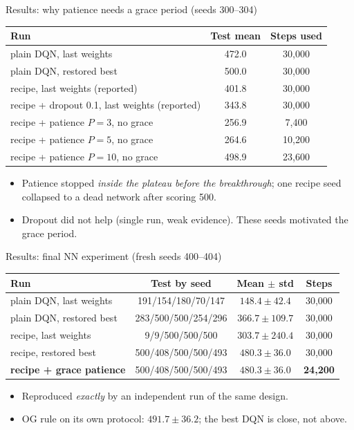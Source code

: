 \documentclass[aspectratio=169]{beamer}
\begin{document}
\begin{frame}{Results: why patience needs a grace period (seeds 300--304)}
\small
\begin{table}
\centering
\begin{tabular}{lcc}
\toprule
\textbf{Run} & \textbf{Test mean} & \textbf{Steps used}\\
\midrule
plain DQN, last weights & 472.0 & 30,000\\
plain DQN, restored best & 500.0 & 30,000\\
recipe, last weights (reported) & 401.8 & 30,000\\
recipe + dropout 0.1, last weights (reported) & 343.8 & 30,000\\
recipe + patience $P=3$, no grace & 256.9 & 7,400\\
recipe + patience $P=5$, no grace & 264.6 & 10,200\\
recipe + patience $P=10$, no grace & 498.9 & 23,600\\
\bottomrule
\end{tabular}
\end{table}
\begin{itemize}
  \item Patience stopped \emph{inside the plateau before the breakthrough}; one recipe seed collapsed to a dead network after scoring 500.
  \item Dropout did not help (single run, weak evidence). These seeds motivated the grace period.
\end{itemize}
\end{frame}

\begin{frame}{Results: final NN experiment (fresh seeds 400--404)}
\small
\begin{table}
\centering
\begin{tabular}{lccc}
\toprule
\textbf{Run} & \textbf{Test by seed} & \textbf{Mean $\pm$ std} & \textbf{Steps}\\
\midrule
plain DQN, last weights & 191/154/180/70/147 & $148.4\pm42.4$ & 30,000\\
plain DQN, restored best & 283/500/500/254/296 & $366.7\pm109.7$ & 30,000\\
recipe, last weights & 9/9/500/500/500 & $303.7\pm240.4$ & 30,000\\
recipe, restored best & 500/408/500/500/493 & $480.3\pm36.0$ & 30,000\\
\textbf{recipe + grace patience} & 500/408/500/500/493 & $\mathbf{480.3\pm36.0}$ & \textbf{24,200}\\
\bottomrule
\end{tabular}
\end{table}
\begin{itemize}
  \item Reproduced \emph{exactly} by an independent run of the same design.
  \item OG rule on its own protocol: $491.7\pm36.2$; the best DQN is close, not above.
\end{itemize}
\end{frame}
\end{document}
